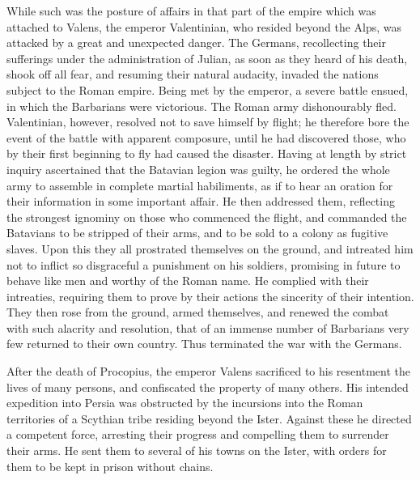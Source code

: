 While such was the posture of affairs in that part of the empire which was attached to Valens, the emperor Valentinian, who resided beyond the Alps, was attacked by a great and
unexpected danger. The Germans, recollecting their sufferings under the administration of Julian, as soon as they heard of his death, shook off all fear, and resuming their natural audacity, invaded the nations subject to the Roman empire. Being met by the emperor, a severe battle ensued, in which the Barbarians were victorious. The Roman army dishonourably fled. Valentinian, however, resolved not to save himself by flight; he therefore bore the event of the battle with apparent composure, until he had discovered those, who by their first beginning to fly had caused the disaster. Having at length by strict inquiry ascertained that the Batavian legion was guilty, he ordered the whole army to assemble in complete martial habiliments, as if to hear an oration for their information in some important affair. He then addressed them, reflecting the strongest ignominy on those who commenced the flight, and commanded the Batavians to be stripped of their arms, and to be sold to a colony as fugitive slaves. Upon this they all prostrated themselves on the ground, and intreated him not to inflict so disgraceful a punishment on his soldiers, promising in future to behave like men and worthy of the Roman name. He complied with their intreaties, requiring them to prove by their actions the sincerity of their intention. They then rose from the ground, armed themselves, and renewed the combat with such alacrity and resolution, that of an immense number of Barbarians very few returned to their own country. Thus terminated the war with the Germans.

After the death of Procopius, the emperor Valens sacrificed to his resentment the lives of many persons, and confiscated the property of many others. His intended expedition into Persia was obstructed by the incursions into the Roman territories of a Scythian tribe residing beyond the Ister. Against these he directed a competent force, arresting their progress and compelling them to surrender their arms. He sent them to several of his towns on the Ister, with orders for them to be kept in prison without chains.

